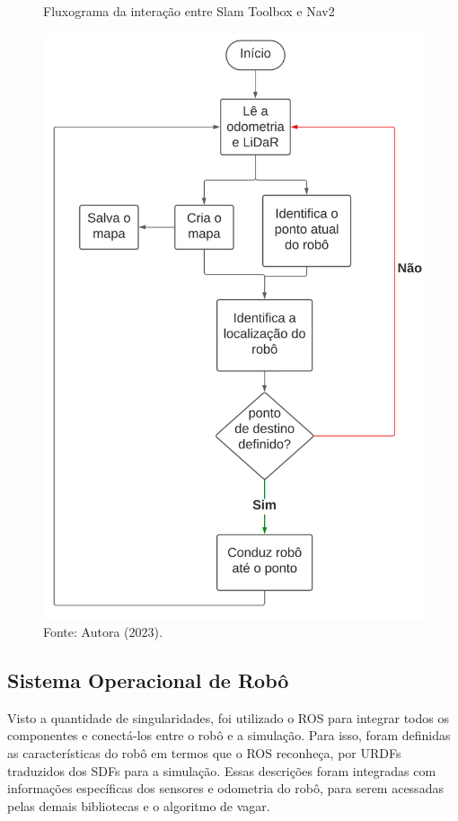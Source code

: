 \begin{figure}[h]
    \centering
    \caption{Fluxograma da interação entre Slam Toolbox e Nav2}
    \includegraphics[scale=0.5]{fluxogramaComando.png}
   
    \caption*{Fonte: Autora (2023).}
    \label{fig:fluxogramaComando}
\end{figure}

\newpage

\subsection{Sistema Operacional de Robô}

Visto a quantidade de singularidades, foi utilizado o ROS para integrar todos os componentes e conectá-los entre o robô e a simulação. Para isso, foram definidas as características do robô em termos que o ROS reconheça, por URDFs traduzidos dos SDFs para a simulação. Essas descrições foram integradas com informações específicas dos sensores e odometria do robô, para serem acessadas pelas demais bibliotecas e o algoritmo de vagar.

